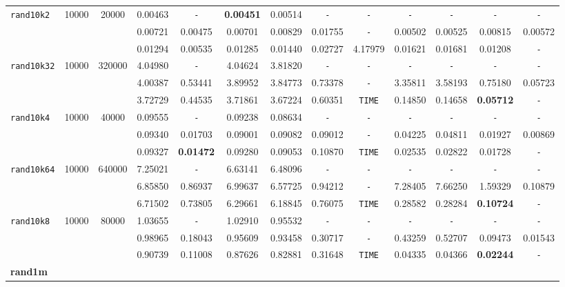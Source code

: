 \begin{table}
{\begin{tabular}{ l c c | c c c c c c c c c c }
\hline
\verb|rand10k2| & 10000 & 20000 & 0.00463 & \verb|-| & \textbf{0.00451} & 0.00514 & \verb|-| & \verb|-| & \verb|-| & \verb|-| & \verb|-| & \verb|-| \\
 &  &  & 0.00721 & 0.00475 & 0.00701 & 0.00829 & 0.01755 & \verb|-| & 0.00502 & 0.00525 & 0.00815 & 0.00572 \\
 &  &  & 0.01294 & 0.00535 & 0.01285 & 0.01440 & 0.02727 & 4.17979 & 0.01621 & 0.01681 & 0.01208 & \verb|-| \\
\hline
\verb|rand10k32| & 10000 & 320000 & 4.04980 & \verb|-| & 4.04624 & 3.81820 & \verb|-| & \verb|-| & \verb|-| & \verb|-| & \verb|-| & \verb|-| \\
 &  &  & 4.00387 & 0.53441 & 3.89952 & 3.84773 & 0.73378 & \verb|-| & 3.35811 & 3.58193 & 0.75180 & 0.05723 \\
 &  &  & 3.72729 & 0.44535 & 3.71861 & 3.67224 & 0.60351 & \verb|TIME| & 0.14850 & 0.14658 & \textbf{0.05712} & \verb|-| \\
\hline
\verb|rand10k4| & 10000 & 40000 & 0.09555 & \verb|-| & 0.09238 & 0.08634 & \verb|-| & \verb|-| & \verb|-| & \verb|-| & \verb|-| & \verb|-| \\
 &  &  & 0.09340 & 0.01703 & 0.09001 & 0.09082 & 0.09012 & \verb|-| & 0.04225 & 0.04811 & 0.01927 & 0.00869 \\
 &  &  & 0.09327 & \textbf{0.01472} & 0.09280 & 0.09053 & 0.10870 & \verb|TIME| & 0.02535 & 0.02822 & 0.01728 & \verb|-| \\
\hline
\verb|rand10k64| & 10000 & 640000 & 7.25021 & \verb|-| & 6.63141 & 6.48096 & \verb|-| & \verb|-| & \verb|-| & \verb|-| & \verb|-| & \verb|-| \\
 &  &  & 6.85850 & 0.86937 & 6.99637 & 6.57725 & 0.94212 & \verb|-| & 7.28405 & 7.66250 & 1.59329 & 0.10879 \\
 &  &  & 6.71502 & 0.73805 & 6.29661 & 6.18845 & 0.76075 & \verb|TIME| & 0.28582 & 0.28284 & \textbf{0.10724} & \verb|-| \\
\hline
\verb|rand10k8| & 10000 & 80000 & 1.03655 & \verb|-| & 1.02910 & 0.95532 & \verb|-| & \verb|-| & \verb|-| & \verb|-| & \verb|-| & \verb|-| \\
 &  &  & 0.98965 & 0.18043 & 0.95609 & 0.93458 & 0.30717 & \verb|-| & 0.43259 & 0.52707 & 0.09473 & 0.01543 \\
 &  &  & 0.90739 & 0.11008 & 0.87626 & 0.82881 & 0.31648 & \verb|TIME| & 0.04335 & 0.04366 & \textbf{0.02244} & \verb|-| \\
\hline
\multicolumn{13}{l}{\textbf{rand1m}} \\

\end{tabular}}
\end{table}
